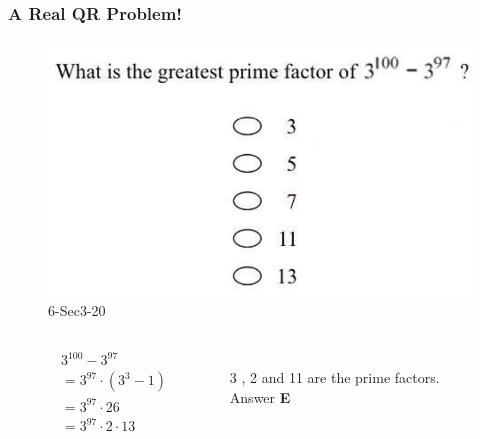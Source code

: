 \documentclass[
	11pt, %
]{beamer}
\begin{document}

\begin{frame}
	\frametitle{A Real QR Problem!}
	\framesubtitle{}
	\begin{figure}
		\includegraphics[width=0.5\linewidth]{Prime_Factorization_Example_Question.png}
		\caption{6-Sec3-20}
	\end{figure}
	\pause

		\begin{columns}[t] %
		\begin{column}{0.45\textwidth} %
			\begin{equation*}
			\begin{aligned}
			&3^{100} - 3^{97} \\
			&= 3^{97} \cdot (3^3 - 1) \\
			&= 3^{97} \cdot 26\\&
			= 3^{97} \cdot 2 \cdot 13
			\end{aligned}
	\end{equation*}
		\end{column}
		\begin{column}{0.5\textwidth} %
		\\ 3 , 2 and 11 are the prime factors. \\
		\pause
		\bigskip
		Answer \textbf{E}
		\end{column}
	\end{columns}
\end{frame}

\end{document}
